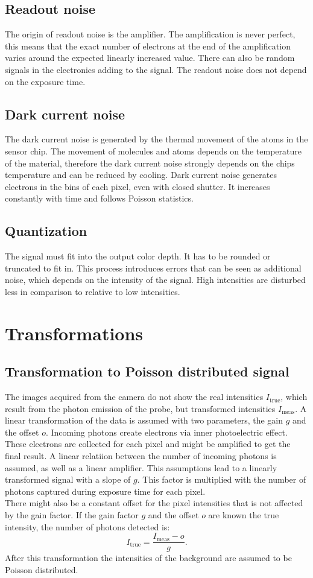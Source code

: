 \subsection{Readout noise}
The origin of readout noise is the amplifier. The amplification is never perfect, this means that the exact number of electrons at the end of the amplification varies around the expected linearly increased value. There can also be random signals in the electronics adding to the signal. The readout noise does not depend on the exposure time.
\subsection{Dark current noise}
The dark current noise is generated by the thermal movement of the atoms in the sensor chip. The movement of molecules and atoms depends on the temperature of the material, therefore the dark current noise strongly depends on the chips temperature and can be reduced by cooling. Dark current noise generates electrons in the bins of each pixel, even with closed shutter. It increases constantly with time and follows Poisson statistics.
\subsection{Quantization}
The signal must fit into the output color depth. It has to be rounded or truncated to fit in. This process introduces errors that can be seen as additional noise, which depends on the intensity of the signal. High intensities are disturbed less in comparison to relative to low intensities.


\section{Transformations}
\subsection{Transformation to Poisson distributed signal} \label{trafoPoiss}
The images acquired from the camera do not show the real intensities
$I_\text{true}$, which result from the photon emission of the probe, but
transformed intensities $I_\text{meas}$.\newline
A linear transformation of the data is assumed with two parameters, the gain $g$ and the offset $o$.
Incoming photons create electrons via inner photoelectric effect. These electrons
are collected for each pixel and might be amplified to get the final result.
A linear relatiion between the number of incoming photons is assumed, as well as a linear amplifier. This assumptions lead to a linearly transformed signal with a slope of $g$. 
This factor
is multiplied with the number of photons captured during exposure time for each
pixel.\\
There might also be a constant offset for the pixel intensities that is not affected by the gain factor.
If the gain factor $g$ and the offset $o$ are known the true intensity, the
number of photons detected is:
\begin{equation}
	I_\text{true} = \dfrac{I_\text{meas}-o}{g}. \label{transtopoiss}
\end{equation}
After this transformation the intensities of the background are assumed to be Poisson distributed.
